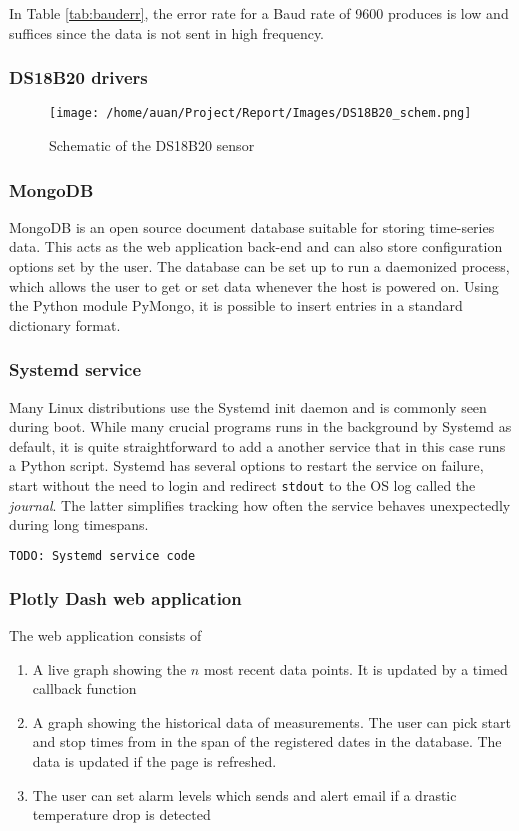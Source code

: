 In Table \ref{tab:bauderr}, the error rate for a Baud rate of 9600 produces is low and suffices since the data is not sent in high frequency. 

\subsubsection{DS18B20 drivers}%
\label{ssub:ds18b20_drivers}
\begin{figure}[h]
  \centering
  \texttt{[image: /home/auan/Project/Report/Images/DS18B20\_schem.png]}
  \caption{Schematic of the DS18B20 sensor}
  \label{fig:sensorschem}
\end{figure}
\subsubsection{MongoDB}%
\label{ssub:mongodb}
MongoDB is an open source document database suitable for storing time-series data. This acts as the web application back-end and can also store configuration options set by the user. The database can be set up to run a daemonized process, which allows the user to get or set data whenever the host is powered on. Using the Python module PyMongo, it is possible to insert entries in a standard dictionary format.

\subsubsection{Systemd service}%
\label{ssub:systemd_service}
Many Linux distributions use the Systemd init daemon and is commonly seen during boot. While many crucial programs runs in the background by Systemd as default, it is quite straightforward to add a another service that in this case runs a Python script. Systemd has several options to restart the service on failure, start without the need to login and redirect \verb|stdout| to the OS log called the \textit{journal}. The latter simplifies tracking how often the service behaves unexpectedly during long timespans.

\begin{lstlisting}[language=bash]
 TODO: Systemd service code 
\end{lstlisting}

\subsubsection{Plotly Dash web application}%
\label{ssub:plotly_dash_web_application}
The web application consists of
\begin{enumerate}
  \item A live graph showing the $n$ most recent data points. It is updated by a timed callback function
  \item A graph showing the historical data of measurements. The user can pick start and stop times from in the span of the registered dates in the database. The data is updated if the page is refreshed.
  \item The user can set alarm levels which sends and alert email if a drastic temperature drop is detected
\end{enumerate}

